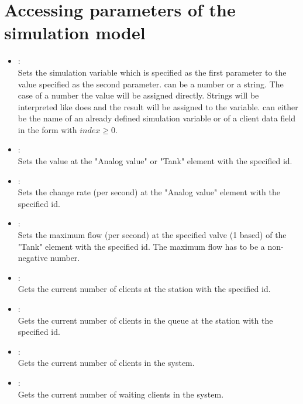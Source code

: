 \section{Accessing parameters of the simulation model}

\begin{itemize}

\item
{}:\\
Sets the simulation variable which is specified as the first parameter to the value specified as the second parameter.  
 can be a number or a string. The case of a number the value will be assigned directly.
Strings will be interpreted like  does and the result will be assigned to the variable. 
can either be the name of an already defined simulation variable or of a client data field in the form
 with $index\ge0$. 
  
\item
{}:\\
Sets the value at the "Analog value" or "Tank" element with the specified id.
  
\item
{}:\\
Sets the change rate (per second) at the "Analog value" element with the specified id.
  
\item
{}:\\
Sets the maximum flow (per second) at the specified valve (1 based) of the "Tank" element
with the specified id. The maximum flow has to be a non-negative number.  
  
\item
{}:\\
Gets the current number of clients at the station with the specified id.
  
\item
{}:\\
Gets the current number of clients in the queue at the station with the specified id.

\item
{}:\\
Gets the current number of clients in the system.
  
\item
{}:\\
Gets the current number of waiting clients in the system.

\end{itemize}

